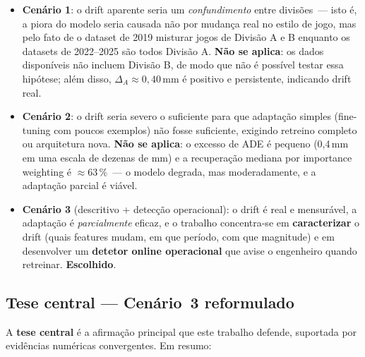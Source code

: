 \documentclass[11pt,a4paper]{article}
\begin{document}
\begin{itemize}[leftmargin=1.4em,itemsep=6pt]
    \item \textbf{Cen\'ario 1}: o drift aparente seria um \emph{confundimento}
          entre divis\~oes~--- isto \'e, a piora do modelo seria causada n\~ao
          por mudan\c{c}a real no estilo de jogo, mas pelo fato de o dataset
          de 2019 misturar jogos de Divis\~ao A e B enquanto os datasets de
          2022--2025 s\~ao todos Divis\~ao A. \textbf{N\~ao se aplica}: os
          dados dispon\'iveis n\~ao incluem Divis\~ao B, de modo que n\~ao \'e
          poss\'ivel testar essa hip\'otese; al\'em disso, $\Delta_A \approx
          0{,}40$\,mm \'e positivo e persistente, indicando drift real.
    \item \textbf{Cen\'ario 2}: o drift seria severo o suficiente para que
          adapta\c{c}\~ao simples (fine-tuning com poucos exemplos) n\~ao fosse
          suficiente, exigindo retreino completo ou arquitetura nova.
          \textbf{N\~ao se aplica}: o excesso de ADE \'e pequeno (0{,}4\,mm
          em uma escala de dezenas de mm) e a recupera\c{c}\~ao mediana por
          importance weighting \'e $\approx 63\,\%$~--- o modelo degrada, mas
          moderadamente, e a adapta\c{c}\~ao parcial \'e vi\'avel.
    \item \textbf{Cen\'ario 3} (descritivo + detec\c{c}\~ao operacional):
          o drift \'e real e mensur\'avel, a adapta\c{c}\~ao \'e
          \emph{parcialmente} eficaz, e o trabalho concentra-se em
          \textbf{caracterizar} o drift (quais features mudam, em que per\'iodo,
          com que magnitude) e em desenvolver um \textbf{detetor online
          operacional} que avise o engenheiro quando retreinar.
          \textbf{Escolhido}.
\end{itemize}

\subsection{Tese central --- Cen\'ario~3 reformulado}

A \textbf{tese central} \'e a afirma\c{c}\~ao principal que este trabalho defende, suportada por evid\^encias num\'ericas convergentes. Em resumo:
\end{document}
